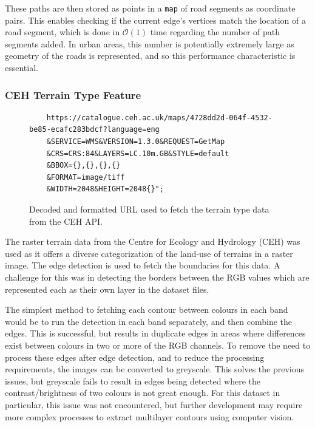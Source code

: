 \documentclass[12pt]{article}
\begin{document}
These paths are then stored as points in a \texttt{map} of road segments as coordinate pairs. This enables checking if the current edge's vertices match the location of a road segment, which is done in $\mathcal{O} (1)$ time regarding the number of path segments added. In urban areas, this number is potentially extremely large as geometry of the roads is represented, and so this performance characteristic is essential.

\subsubsection{CEH Terrain Type Feature}

\begin{figure}[H]
  \centering
  \begin{lstlisting}
	https://catalogue.ceh.ac.uk/maps/4728dd2d-064f-4532-be85-ecafc283bdcf?language=eng
	&SERVICE=WMS&VERSION=1.3.0&REQUEST=GetMap
	&CRS=CRS:84&LAYERS=LC.10m.GB&STYLE=default
	&BBOX={},{},{},{}
	&FORMAT=image/tiff
	&WIDTH=2048&HEIGHT=2048{}";
	\end{lstlisting}
  \vspace{-2em}
  \caption{Decoded and formatted URL used to fetch the terrain type data from the CEH API.}
  \label{api:terrain}
\end{figure}

The raster terrain data from the Centre for Ecology and Hydrology (CEH) was used as it offers a diverse categorization of the land-use of terrains in a raster image. The edge detection is used to fetch the boundaries for this data. A challenge for this was in detecting the borders between the RGB values which are represented each as their own layer in the dataset files.

The simplest method to fetching each contour between colours in each band would be to run the detection in each band separately, and then combine the edges. This is successful, but results in duplicate edges in areas where differences exist between colours in two or more of the RGB channels. To remove the need to process these edges after edge detection, and to reduce the processing requirements, the images can be converted to greyscale. This solves the previous issues, but greyscale fails to result in edges being detected where the contrast/brightness of two colours is not great enough. For this dataset in particular, this issue was not encountered, but further development may require more complex processes to extract multilayer contours using computer vision.
\end{document}
